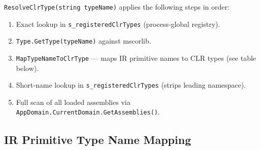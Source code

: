 \documentclass[11pt,a4paper]{article}
\newcommand{\code}[1]{\texttt{\small #1}}
\begin{document}
\code{ResolveClrType(string typeName)} applies the following steps in order:

\begin{enumerate}[leftmargin=2em]
  \item Exact lookup in \code{s\_registeredClrTypes} (process-global registry).
  \item \code{Type.GetType(typeName)} against mscorlib.
  \item \code{MapTypeNameToClrType} — maps IR primitive names to CLR types
        (see table below).
  \item Short-name lookup in \code{s\_registeredClrTypes} (strips leading
        namespace).
  \item Full scan of all loaded assemblies via
        \code{AppDomain.CurrentDomain.GetAssemblies()}.
\end{enumerate}

\subsection{IR Primitive Type Name Mapping}
\end{document}
